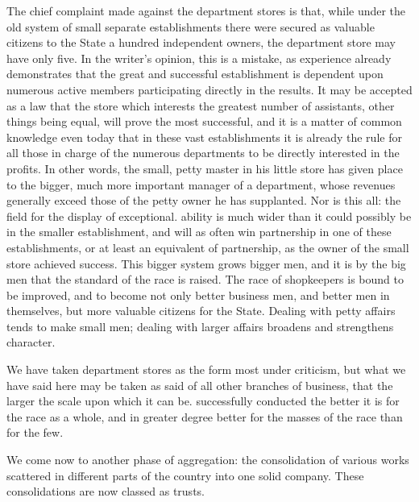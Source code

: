 \documentclass[11pt,openany]{book}
\begin{document}
The chief complaint made against the department stores is that, while under the old system of small separate establishments there were secured as valuable citizens to the State a hundred independent owners, the department store may have only five. In the writer's opinion, this is a mistake, as experience already demonstrates that the great and successful establishment is dependent upon numerous active members participating directly in the results. It may be accepted as a law that the store which interests the greatest number of assistants, other things being equal, will prove the most successful, and it is a matter of common knowledge even today that in these vast establishments it is already the rule for all those in charge of the numerous departments to be directly interested in the profits. In other words, the small, petty master in his little store has given place to the bigger, much more important manager of a department, whose revenues generally exceed those of the petty owner he has supplanted. Nor is this all: the field for the display of exceptional. ability is much wider than it could possibly be in the smaller establishment, and will as often win partnership in one of these establishments, or at least an equivalent of partnership, as the owner of the small store achieved success. This bigger system grows bigger men, and it is by the big men that the standard of the race is raised. The race of shopkeepers is bound to be improved, and to become not only better business men, and better men in themselves, but more valuable citizens for the State. Dealing with petty affairs tends to make small men; dealing with larger affairs broadens and strengthens character.

We have taken department stores as the form most under criticism, but what we have said here may be taken as said of all other branches of business, that the larger the scale upon which it can be. successfully conducted the better it is for the race as a whole, and in greater degree better for the masses of the race than for the few.

We come now to another phase of aggregation: the consolidation of various works scattered in different parts of the country into one solid company. These consolidations are now classed as trusts.
\end{document}
